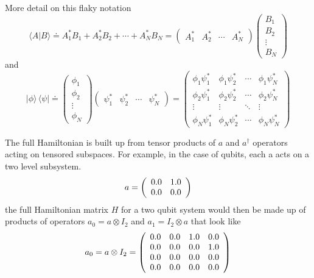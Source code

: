 \documentclass{article}
\begin{document}
More detail on this flaky notation
\[
\langle A | B \rangle \doteq A_1^* B_1 + A_2^* B_2 + \cdots + A_N^* B_N =
\begin{pmatrix} A_1^* & A_2^* & \cdots & A_N^* \end{pmatrix}
\begin{pmatrix} B_1 \\ B_2 \\ \vdots \\ B_N \end{pmatrix}
\]
and
\[
|\phi \rangle \, \langle \psi | \doteq 
\begin{pmatrix} \phi_1 \\ \phi_2 \\ \vdots \\ \phi_N \end{pmatrix}
\begin{pmatrix} \psi_1^* & \psi_2^* & \cdots & \psi_N^* \end{pmatrix}
= \begin{pmatrix}
\phi_1 \psi_1^* & \phi_1 \psi_2^* & \cdots & \phi_1 \psi_N^* \\
\phi_2 \psi_1^* & \phi_2 \psi_2^* & \cdots & \phi_2 \psi_N^* \\
\vdots & \vdots & \ddots & \vdots \\
\phi_N \psi_1^* & \phi_N \psi_2^* & \cdots & \phi_N \psi_N^* \end{pmatrix}
\]

The full Hamiltonian is built up from tensor products of $a$ and $a^\dagger$ operators acting on tensored subspaces.  For example, in the case of qubits, each a acts on a two level subsystem. 
\begin{equation*}a = \left(\begin{array}{*{11}c}0.0 & 1.0\\0.0 & 0.0\\\end{array}\right)\end{equation*}
the full Hamiltonian matrix $H$ for a two qubit system would then be made up of products of operators
$a_0 = a \otimes I_2$ and $a_1 = I_2 \otimes a$ that look like
\begin{equation*}a_0 = a \otimes I_2 = \left(\begin{array}{*{11}c}0.0 & 0.0 & 1.0 & 0.0\\0.0 & 0.0 & 0.0 & 1.0\\0.0 & 0.0 & 0.0 & 0.0\\0.0 & 0.0 & 0.0 & 0.0\\\end{array}\right)\end{equation*}
\end{document}
